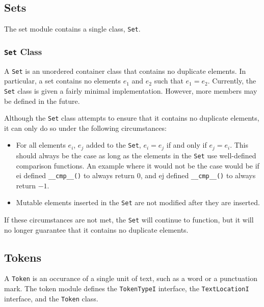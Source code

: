 \documentclass{article}
\begin{document}
\subsection{Sets}

The set module contains a single class, \texttt{Set}.

\subsubsection{\texttt{Set} Class}

    A \texttt{Set} is an unordered container class that contains no
    duplicate elements.  In particular, a set contains no elements
    $e_1$ and $e_2$ such that $e_1=e_2$.  Currently, the \texttt{Set}
    class is given a fairly minimal implementation.  However, more
    members may be defined in the future.

    Although the \texttt{Set} class attempts to ensure that it
    contains no duplicate elements, it can only do so under the
    following circumstances:
    
    \begin{itemize}
      \item For all elements $e_i$, $e_j$ added to the \texttt{Set},
           $e_i=e_j$ if and only if $e_j=e_i$.  This should always be the
           case as long as the elements in the \texttt{Set} use
           well-defined comparison functions.  An example where it
           would not be the case would be if ei defined
           \texttt{\_\_cmp\_\_()} to always return 0, and ej
           defined \texttt{\_\_cmp\_\_()} to always return $-1$.
           
      \item Mutable elements inserted in the \texttt{Set} are not
           modified after they are inserted.
    \end{itemize}

    If these circumstances are not met, the \texttt{Set} will
    continue to function, but it will no longer guarantee that it
    contains no duplicate elements.
 
\subsection{Tokens}

A \texttt{Token} is an occurance of a single unit of text, such as a word or a
punctuation mark.  The token module defines the \texttt{TokenTypeI}
interface, the \texttt{TextLocationI} interface, and the \texttt{Token}
class.
\end{document}
